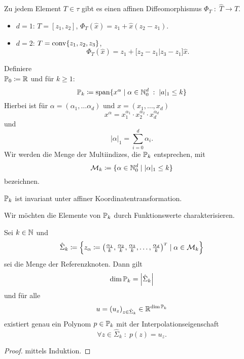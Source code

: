 \documentclass[../skript.tex]{subfiles}
\begin{document}
\begin{remark} %
\label{def:c2e3s3}
Zu jedem Element $T \in \tau$ gibt es einen affinen Diffeomorphismus $\Phi_T \; : \; \hat{T} \to T$.
\begin{itemize}
\item $d = 1$: $T = [z_1, z_2]$, $\Phi_T(\hat{x}) = z_1 + \hat{x} (z_2 - z_1)$.
\item $d = 2$: $T = \operatorname{conv} \{ z_1, z_2, z_3\}$, 
\[
	\Phi_T(\hat{x}) = z_1 + \Bigg[ z_2 - z_1 \Bigg| z_3 - z_1 \Bigg] \hat{x}.
\]
\end{itemize}
\end{remark}
\begin{definition} %
\label{def:c2e3s4}
Definiere \\ $\mathbb{P}_0 \coloneqq \mathbb{R}$ und für $k \geq 1$:
\[
	\mathbb{P}_k \coloneqq \operatorname*{span} \{ x^\alpha \mid \alpha \in \mathbb{N}_0^d \; : \; |a|_1 \leq k \}
\]
Hierbei ist für $\alpha = (\alpha_1, \ldots \alpha_d)$ und $x = (x_1, \ldots, x_d)$
\[
	x^\alpha = x_1^{\alpha_1} \cdot x_2^{\alpha_2} \cdot x_d^{\alpha_d}
\]
und
\[
	|\alpha|_1 = \sum_{i = 0}^d \alpha_i.
\]
Wir werden die Menge der Multiindizes, die $\mathbb{P}_k$ entsprechen, mit
\[
	\mathcal{M}_k \coloneqq \{ \alpha \in \mathbb{N}_0^d \mid |\alpha|_1 \leq k\}
\]
bezeichnen.
\end{definition}
\begin{remark} %
\label{bem:c2e3s5}
$\mathbb{P}_k$ ist invariant unter affiner Koordinatentransformation.
\end{remark}
Wir möchten die Elemente von $\mathbb{P}_k$ durch Funktionswerte charakterisieren.
\begin{theorem} %
\label{thm:c2e3s6}
Sei $k \in \mathbb{N}$ und
\[
\hat{\Sigma}_k \coloneqq \left\{ z_\alpha \coloneqq \begin{pmatrix}
\frac{\alpha_1}{k}, \frac{\alpha_2}{k}, \frac{\alpha_3}{k}, \ldots, \frac{\alpha_d}{k}
\end{pmatrix}^\tp \mid \alpha \in \mathcal{M}_k \right\}
\]
sei die Menge der Referenzknoten.
Dann gilt
\[
\dim \mathbb{P}_k = \left|\hat{\Sigma}_k\right|
\]
und für alle
\[
	u = (u_z)_{z \in \hat{\Sigma}_k} \in \mathbb{R}^{\dim \mathbb{P}_k}
\]
existiert genau ein Polynom $p \in \mathbb{P}_k$ mit der Interpolationseigenschaft
\[
	\forall z \in \hat{\Sigma}_k \; : \; p(z) = u_z.
\]
\end{theorem}
\begin{proof}
mittels Induktion.
\end{proof}
\end{document}
